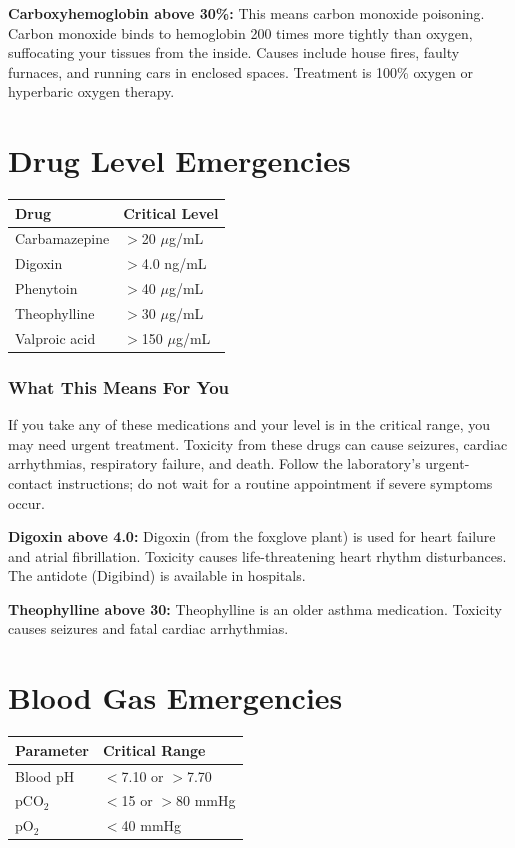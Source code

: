 \textbf{Carboxyhemoglobin above 30\%:} This means carbon monoxide poisoning. Carbon monoxide binds to hemoglobin 200 times more tightly than oxygen, suffocating your tissues from the inside. Causes include house fires, faulty furnaces, and running cars in enclosed spaces. Treatment is 100\% oxygen or hyperbaric oxygen therapy.

\clearpage
\section{Drug Level Emergencies}

\begin{longtable}{@{}ll@{}}
\toprule
\textbf{Drug} & \textbf{Critical Level} \\
\midrule
Carbamazepine & $>$20 $\mu$g/mL \\
Digoxin & $>$4.0 ng/mL \\
Phenytoin & $>$40 $\mu$g/mL \\
Theophylline & $>$30 $\mu$g/mL \\
Valproic acid & $>$150 $\mu$g/mL \\
\bottomrule
\end{longtable}

\subsubsection{What This Means For You}

If you take any of these medications and your level is in the critical range, you may need urgent treatment. Toxicity from these drugs can cause seizures, cardiac arrhythmias, respiratory failure, and death. Follow the laboratory's urgent-contact instructions; do not wait for a routine appointment if severe symptoms occur.

\textbf{Digoxin above 4.0:} Digoxin (from the foxglove plant) is used for heart failure and atrial fibrillation. Toxicity causes life-threatening heart rhythm disturbances. The antidote (Digibind) is available in hospitals.

\textbf{Theophylline above 30:} Theophylline is an older asthma medication. Toxicity causes seizures and fatal cardiac arrhythmias.

\clearpage
\section{Blood Gas Emergencies}

\begin{longtable}{@{}ll@{}}
\toprule
\textbf{Parameter} & \textbf{Critical Range} \\
\midrule
Blood pH & $<$7.10 or $>$7.70 \\
pCO$_2$ & $<$15 or $>$80 mmHg \\
pO$_2$ & $<$40 mmHg \\
\bottomrule
\end{longtable}

